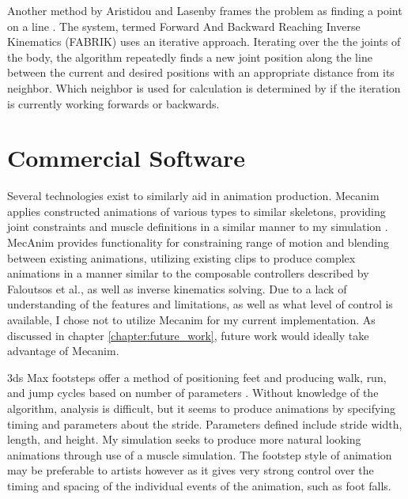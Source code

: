 Another method by Aristidou and Lasenby frames the problem as finding a point on a line \cite{fabrik}.  The system, termed Forward And Backward Reaching Inverse Kinematics (FABRIK) uses an iterative approach.  Iterating over the the joints of the body, the algorithm repeatedly finds a new joint position along the line between the current and desired positions with an appropriate distance from its neighbor.  Which neighbor is used for calculation is determined by if the iteration is currently working forwards or backwards.

\section{Commercial Software}
\label{section:commercial_bg}
Several technologies exist to similarly aid in animation production. \unity{} Mecanim applies constructed animations of various types to similar skeletons, providing joint constraints and muscle definitions in a similar manner to my simulation \cite{unity_mecanim}.  MecAnim provides functionality for constraining range of motion and blending between existing animations, utilizing existing clips to produce complex animations in a manner similar to the composable controllers described by Faloutsos et al., as well as inverse kinematics solving.  Due to a lack of understanding of the features and limitations, as well as what level of control is available, I chose not to utilize Mecanim for my current implementation.  As discussed in chapter \ref{chapter:future_work}, future work would ideally take advantage of Mecanim.

3ds Max footsteps offer a method of positioning feet and producing walk, run, and jump cycles based on  number of parameters \cite{3dsmax}.  Without knowledge of the algorithm, analysis is difficult, but it seems to produce animations by specifying timing and parameters about the stride.  Parameters defined include stride width, length, and height.  My simulation seeks to produce more natural looking animations through use of a muscle simulation.  The footstep style of animation may be preferable to artists however as it gives very strong control over the timing and spacing of the individual events of the animation, such as foot falls.

